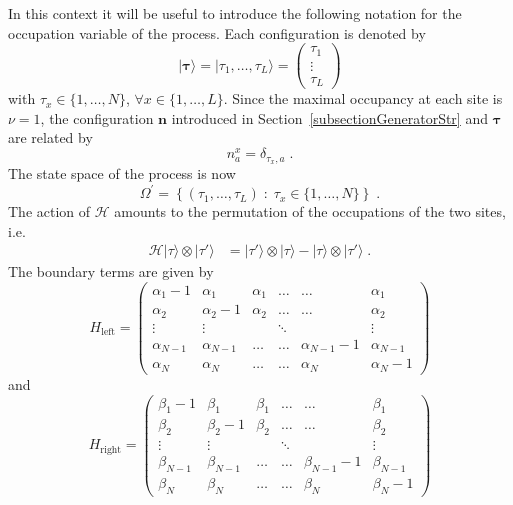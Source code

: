\documentclass[10pt]{article}
\numberwithin{equation}{section}
\numberwithin{equation}{subsection}
\newcommand{\dt}{\;.}
\begin{document}
 In this context it will be useful to introduce the following notation for the occupation variable of the process. Each configuration is denoted by
\begin{equation}\label{Tau-Notation}
	|\bm{\tau}\rangle=|\tau_{1},\ldots,\tau_{L}\rangle =\begin{pmatrix}
		\tau_{1}\\
		\vdots\\
		\tau_{L}
	\end{pmatrix}
\end{equation} 
with $\tau_{x}\in \{1,\ldots,N\}$, $\forall x\in \{1,\ldots,L\}$. Since the maximal occupancy at each site is $\nu=1$,  the configuration $\bm{n}$ introduced in Section~\ref{subsectionGeneratorStr} and $\bm{\tau}$ are related by 
\begin{equation}\label{notation-change-relation}
	n_{a}^{x}=\delta_{\tau_{x},a}\dt
\end{equation}
The state space of the process is now 
\begin{equation}
	\Omega^{'}=\left\{(\tau_{1},\ldots,\tau_{L})\;:\; \tau_{x}\in\{1,\ldots,N\}\right\}\dt
\end{equation}
The action of $\mathcal{H}$ amounts to the permutation of the occupations of the two sites, i.e.
\begin{equation}
	\begin{split}
		\mathcal{H}| \tau\rangle\otimes   |\tau'\rangle&=|\tau'\rangle \otimes |\tau\rangle-|\tau\rangle \otimes|\tau'\rangle\dt
	\end{split}
\end{equation}
The boundary terms are given by 
\begin{equation}
	H_{\text{left}}=\begin{pmatrix}
		\alpha_{1}-1&\alpha_{1}&\alpha_{1}&\ldots&\ldots&\alpha_{1}\\
		\alpha_{2}&\alpha_{2}-1&\alpha_{2}&\ldots&\ldots&\alpha_{2}\\
		\vdots&\vdots& &\ddots& &\vdots\\
		\alpha_{N-1}&\alpha_{N-1}&\ldots&\ldots&\alpha_{N-1}-1&\alpha_{N-1}\\
		\alpha_{N}&\alpha_{N}&\ldots&\ldots&\alpha_{N}&\alpha_{N}-1
	\end{pmatrix}
\end{equation}
and 
\begin{equation}
	H_{\text{right}}=\begin{pmatrix}
		\beta_{1}-1&\beta_{1}&\beta_{1}&\ldots&\ldots&\beta_{1}\\
		\beta_{2}&\beta_{2}-1&\beta_{2}&\ldots&\ldots&\beta_{2}\\
		\vdots&\vdots& &\ddots& &\vdots\\
		\beta_{N-1}&\beta_{N-1}&\ldots&\ldots&\beta_{N-1}-1&\beta_{N-1}\\
		\beta_{N}&\beta_{N}&\ldots&\ldots&\beta_{N}&\beta_{N}-1
	\end{pmatrix}
\end{equation}
\end{document}
